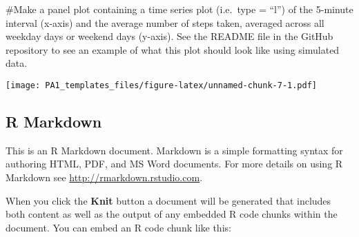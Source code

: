 \documentclass[
]{article}
\newenvironment{Shaded}{\begin{snugshade}}{\end{snugshade}}
\newcommand{\DataTypeTok}[1]{\textcolor[rgb]{0.13,0.29,0.53}{#1}}
\newcommand{\DecValTok}[1]{\textcolor[rgb]{0.00,0.00,0.81}{#1}}
\newcommand{\KeywordTok}[1]{\textcolor[rgb]{0.13,0.29,0.53}{\textbf{#1}}}
\newcommand{\NormalTok}[1]{#1}
\newcommand{\OperatorTok}[1]{\textcolor[rgb]{0.81,0.36,0.00}{\textbf{#1}}}
\newcommand{\StringTok}[1]{\textcolor[rgb]{0.31,0.60,0.02}{#1}}
\begin{document}
\#Make a panel plot containing a time series plot
(i.e.~\color{red}{\verb|type = "l"|}type = ``l'') of the 5-minute
interval (x-axis) and the average number of steps taken, averaged across
all weekday days or weekend days (y-axis). See the README file in the
GitHub repository to see an example of what this plot should look like
using simulated data.

\begin{Shaded}
\end{Shaded}

\texttt{[image: PA1\_templates\_files/figure-latex/unnamed-chunk-7-1.pdf]}

\hypertarget{r-markdown}{%
\subsection{R Markdown}\label{r-markdown}}

This is an R Markdown document. Markdown is a simple formatting syntax
for authoring HTML, PDF, and MS Word documents. For more details on
using R Markdown see \url{http://rmarkdown.rstudio.com}.

When you click the \textbf{Knit} button a document will be generated
that includes both content as well as the output of any embedded R code
chunks within the document. You can embed an R code chunk like this:
\end{document}

